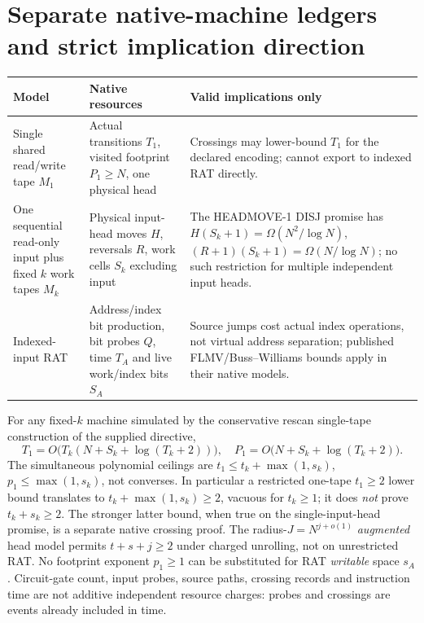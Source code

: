 \documentclass[11pt]{article}
\begin{document}
\section{Separate native-machine ledgers and strict implication direction}
\begin{center}\small
\begin{tabular}{p{.23\linewidth}p{.33\linewidth}p{.33\linewidth}}
\toprule
Model & Native resources & Valid implications only\\
\midrule
Single shared read/write tape \(M_1\) & Actual transitions \(T_1\), visited footprint \(P_1\ge N\), one physical head & Crossings may lower-bound \(T_1\) for the declared encoding; cannot export to indexed RAT directly.\\
One sequential read-only input plus fixed \(k\) work tapes \(M_k\) & Physical input-head moves \(H\), reversals \(R\), work cells \(S_k\) excluding input & The HEADMOVE-1 DISJ promise has \(H(S_k+1)=\Omega(N^2/\log N)\), \((R+1)(S_k+1)=\Omega(N/\log N)\); no such restriction for multiple independent input heads.\\
Indexed-input RAT & Address/index bit production, bit probes \(Q\), time \(T_A\) and live work/index bits \(S_A\) & Source jumps cost actual index operations, not virtual address separation; published FLMV/Buss--Williams bounds apply in their native models.\\
\bottomrule
\end{tabular}
\end{center}
For any fixed-\(k\) machine simulated by the conservative rescan
single-tape construction of the supplied directive,
\[
 T_1=O\big(T_k(N+S_k+\log(T_k+2))\big),\quad
 P_1=O\big(N+S_k+\log(T_k+2)\big).
\]
The simultaneous polynomial ceilings are
\(t_1\le t_k+\max(1,s_k)\),
\(p_1\le\max(1,s_k)\), not converses. In particular a restricted
one-tape \(t_1\ge2\) lower bound translates to
\(t_k+\max(1,s_k)\ge2\), vacuous for \(t_k\ge1\);
it does \emph{not} prove \(t_k+s_k\ge2\).
The stronger latter bound, when true on the single-input-head
promise, is a separate native crossing proof.
The radius-\(J=N^{j+o(1)}\) \emph{augmented} head model permits
\(t+s+j\ge2\) under charged unrolling, not on unrestricted RAT.
No footprint exponent \(p_1\ge1\) can be substituted for
RAT \emph{writable} space \(s_A\).
Circuit-gate count, input probes, source paths, crossing records
and instruction time are not additive independent resource charges:
probes and crossings are events already included in time.
\end{document}
